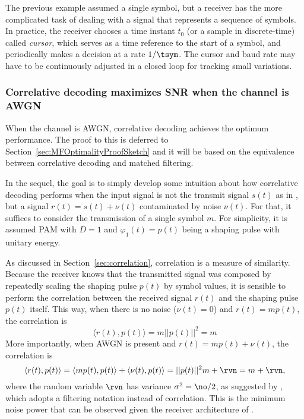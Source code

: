 The previous example assumed a single symbol, but a receiver has the more complicated task
of dealing with a signal that represents a sequence of symbols. 
In practice, the receiver chooses a time instant $t_0$ (or a sample in discrete-time) called \emph{cursor}, which serves as a time reference to the start of a symbol, and periodically makes a decision at a rate $1/\tsym$. The cursor and baud rate may
have to be continuously adjusted in a closed loop for tracking small variations.

\subsubsection{Correlative decoding maximizes SNR when the channel is AWGN}

When the channel is AWGN, correlative decoding achieves the optimum performance.
The proof to this is deferred to Section~\ref{sec:MFOptimalityProofSketch} and it will
be based on the equivalence between correlative decoding and matched filtering.

In the sequel, the goal is to simply develop some intuition about how correlative decoding
performs when the input signal is
not the transmit signal $s(t)$ as in , but a
signal $r(t)=s(t)+ \nu(t)$ contaminated by noise $\nu(t)$.
For that, it suffices to consider the
transmission of a single symbol $m$. For simplicity, it is assumed PAM with $D=1$ and
$\varphi_1(t)=p(t)$ being a shaping pulse with unitary energy.

As discussed in Section~\ref{sec:correlation}, correlation is a measure of similarity. Because the receiver knows that the transmitted signal was composed by repeatedly scaling the shaping pulse $p(t)$ by symbol values, it is sensible to perform the correlation between the received signal $r(t)$ and the shaping pulse $p(t)$ itself. This way, when there is no noise ($\nu(t)=0$) and $r(t)=m p(t)$, the correlation is 
\begin{equation}
\langle r(t),p(t) \rangle = m || p(t) ||^2 = m
\label{eq:mfParcelOfInterest}
\end{equation}
More importantly, when AWGN is present and $r(t)=m p(t) + \nu(t)$, the correlation is
\begin{equation}
\langle r(t),p(t)\rangle  = \langle m p(t),p(t)\rangle  + \langle \nu(t),p(t) \rangle  = || p(t) ||^2 m + \rvn = m + \rvn,
\label{eq:mfNoisySignal}
\end{equation}
where the random variable $\rvn$ has variance $\sigma^2 = \no / 2$, as suggested by , which adopts a filtering notation instead of correlation.
This is the minimum noise power that can be observed given the receiver architecture of .

